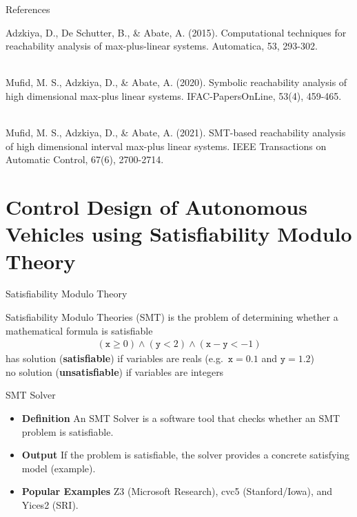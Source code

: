 \documentclass[aspectratio=169]{beamer} %
\begin{document}
	\begin{frame}{References}
		
		Adzkiya, D., De Schutter, B., \& Abate, A. (2015). Computational techniques for reachability analysis of max-plus-linear systems. Automatica, 53, 293-302.
		
		\-\\
		
		Mufid, M. S., Adzkiya, D., \& Abate, A. (2020). Symbolic reachability analysis of high dimensional max-plus linear systems. IFAC-PapersOnLine, 53(4), 459-465.
		
		\-\\
		
		Mufid, M. S., Adzkiya, D., \& Abate, A. (2021). SMT-based reachability analysis of high dimensional interval max-plus linear systems. IEEE Transactions on Automatic Control, 67(6), 2700-2714.
		
	\end{frame}
	
	\section{Control Design of Autonomous Vehicles using Satisfiability Modulo Theory}
	
	\begin{frame}{Satisfiability Modulo Theory}
		
		Satisfiability Modulo Theories (SMT) is the problem of determining whether a mathematical formula is satisfiable
		\begin{align*}
			(\mathtt{x} \geq 0) \wedge (\mathtt{y} < 2) \wedge (\mathtt{x} - \mathtt{y} < -1)
		\end{align*}
		has solution (\textbf{satisfiable}) if variables are reals (e.g.\ $\mathtt{x} = 0.1$ and $\mathtt{y} = 1.2$) \\
		no solution (\textbf{unsatisfiable}) if variables are integers
		
		\begin{block}{SMT Solver}
			\begin{itemize}
				\item \textbf{Definition} An SMT Solver is a software tool that checks whether an SMT problem is satisfiable.
				\item \textbf{Output} If the problem is satisfiable, the solver provides a concrete satisfying model (example).
				\item \textbf{Popular Examples} Z3 (Microsoft Research), cvc5 (Stanford/Iowa), and Yices2 (SRI).
			\end{itemize}
		\end{block}
		
	\end{frame}
	
\end{document}

